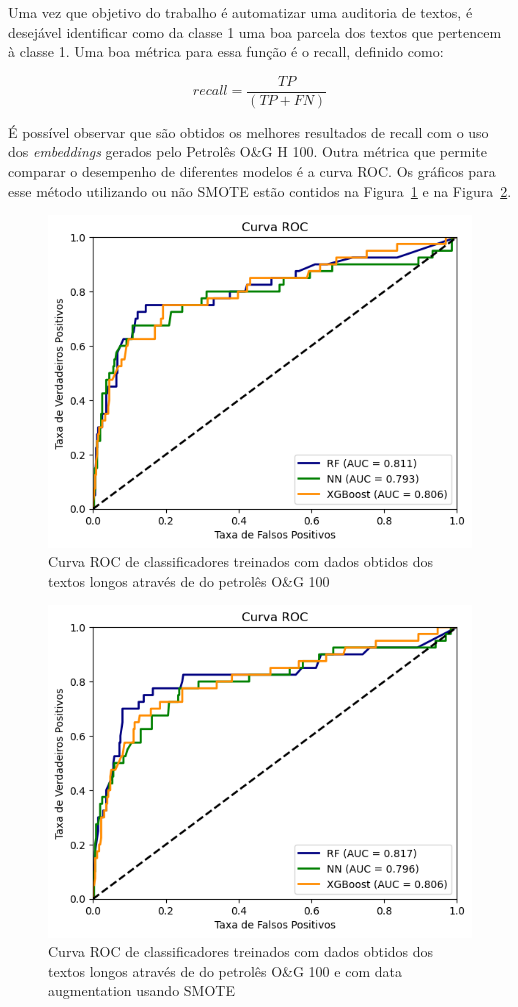 \documentclass[conference]{IEEEtran}
\begin{document}
Uma vez que objetivo do trabalho é automatizar uma auditoria de textos, é desejável identificar como da classe 1 uma boa parcela dos textos que pertencem à classe 1. Uma boa métrica para essa função é o recall, definido como:


$$recall = \frac{TP}{(TP + FN)}$$



É possível observar que são obtidos os melhores resultados de recall com o uso dos \textit{embeddings} gerados pelo Petrolês O\&G H 100. Outra métrica que permite comparar o desempenho de diferentes modelos é a curva ROC. Os gráficos para esse método utilizando ou não SMOTE estão contidos na Figura~\ref{fig:petrolesoeg100} e na Figura~\ref{fig:petrolesoeg100-sm}.

  \begin{figure}[ht]
  \centering
  \includegraphics[width=.48\textwidth]{petrolesoeg100.png}
  \caption{Curva ROC de classificadores treinados com dados obtidos dos textos longos através de do petrolês O\&G 100}
  \label{fig:petrolesoeg100}
  \end{figure}

  \begin{figure}[ht]
  \centering
  \includegraphics[width=.48\textwidth]{petrolesoeg100-sm.png}
  \caption{Curva ROC de classificadores treinados com dados obtidos dos textos longos através de do petrolês O\&G 100 e com data augmentation usando SMOTE}
  \label{fig:petrolesoeg100-sm}
  \end{figure}
\end{document}
